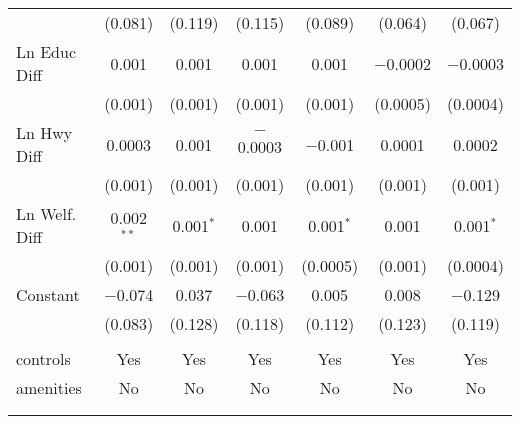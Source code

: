 \begin{table}[!htbp]
\begin{tabular}{@{\extracolsep{5pt}}lcccccc}
  & (0.081) & (0.119) & (0.115) & (0.089) & (0.064) & (0.067) \\ 
  Ln Educ Diff & 0.001 & 0.001 & 0.001 & 0.001 & $-$0.0002 & $-$0.0003 \\ 
  & (0.001) & (0.001) & (0.001) & (0.001) & (0.0005) & (0.0004) \\ 
  Ln Hwy Diff & 0.0003 & 0.001 & $-$0.0003 & $-$0.001 & 0.0001 & 0.0002 \\ 
  & (0.001) & (0.001) & (0.001) & (0.001) & (0.001) & (0.001) \\ 
  Ln Welf. Diff & 0.002$^{**}$ & 0.001$^{*}$ & 0.001 & 0.001$^{*}$ & 0.001 & 0.001$^{*}$ \\ 
  & (0.001) & (0.001) & (0.001) & (0.0005) & (0.001) & (0.0004) \\ 
  Constant & $-$0.074 & 0.037 & $-$0.063 & 0.005 & 0.008 & $-$0.129 \\ 
  & (0.083) & (0.128) & (0.118) & (0.112) & (0.123) & (0.119) \\ 
 \hline \\[-1.8ex] 
controls & Yes & Yes & Yes & Yes & Yes & Yes \\ 
amenities & No & No & No & No & No & No \\ 
\hline \\[-1.8ex] 
\hline 
\hline \\[-1.8ex] 
\end{tabular} 
\end{table} 
